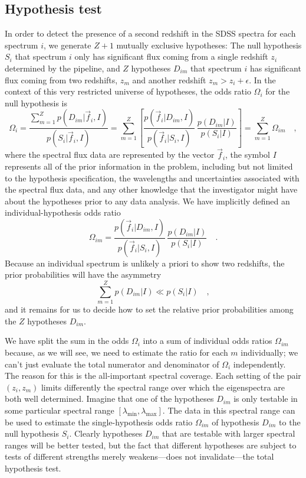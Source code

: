 \documentclass[12pt,preprint]{aastex}
\begin{document}
\subsection{Hypothesis test}
In order to detect the presence of a second redshift in the SDSS
spectra for each spectrum $i$, we generate $Z+1$ mutually exclusive
hypotheses: The null hypothesis $S_i$ that spectrum $i$ only has
significant flux coming from a single redshift $z_i$ determined by the
 pipeline, and $Z$ hypotheses $D_{im}$ that spectrum
$i$ has significant flux coming from two redshifts, $z_m$ and another
redshift $z_m>z_i+\epsilon$.  In the context of this very restricted
universe of hypotheses, the odds ratio $\Omega_i$ for the null
hypothesis is
\begin{equation}\label{eq:odds}
\Omega_i = \frac{\sum_{m=1}^Z p(D_{im}|\vec{f}_i,I)}{p(S_i|\vec{f}_i,I)}
 = \sum_{m=1}^Z \left[\frac{p(\vec{f}_i|D_{im},I)}{p(\vec{f}_i|S_i,I)}
 \,\frac{p(D_{im}|I)}{p(S_i|I)}\right] = \sum_{m=1}^Z\Omega_{im}\quad,
\end{equation}
where the spectral flux data are represented by the vector $\vec{f}_i$, the symbol $I$ represents all of the prior information in the problem, including but not limited to the hypothesis specification, the wavelengths and uncertainties associated with the spectral flux data, and any other knowledge that the investigator might have about the hypotheses prior to any data analysis. We have implicitly defined an individual-hypothesis odds ratio
\begin{equation}
\Omega_{im} = \frac{p(\vec{f}_i|D_{im},I)}{p(\vec{f}_i|S_i,I)}
  \,\frac{p(D_{im}|I)}{p(S_i|I)}\quad.
\end{equation}
Because an individual spectrum is unlikely a priori to show two redshifts, the prior probabilities will have the asymmetry
\begin{equation}
\sum_{m=1}^Z p(D_{im}|I) \ll p(S_i|I) \quad,
\end{equation}
and it remains for us to decide how to set the relative prior probabilities among the $Z$ hypotheses $D_{im}$.

We have split the sum in the odds $\Omega_i$ into a sum of individual odds ratios $\Omega_{im}$ because, as we will see, we need to estimate the ratio for each $m$ individually; we can't just evaluate the total numerator and denominator of $\Omega_i$ independently.  The reason for this is the all-important spectral coverage.  Each setting of the pair $(z_i,z_m)$ limits differently the spectral range over which the eigenspectra are both well determined. Imagine that one of the hypotheses $D_{im}$ is only testable in some particular spectral range $[\lambda_{\min},\lambda_{\max}]$.  The data in this spectral range can be used to estimate the single-hypothesis odds ratio $\Omega_{im}$ of hypothesis $D_{im}$ to the null hypothesis $S_i$. Clearly hypotheses $D_{im}$ that are testable with larger spectral ranges will be better tested, but the fact that different hypotheses are subject to tests of different strengths merely weakens---does not invalidate---the total hypothesis test.
\end{document}
